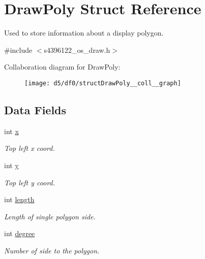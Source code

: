 \hypertarget{structDrawPoly}{}\section{Draw\+Poly Struct Reference}
\label{structDrawPoly}


Used to store information about a display polygon.  




{\ttfamily \#include $<$s4396122\+\_\+os\+\_\+draw.\+h$>$}



Collaboration diagram for Draw\+Poly\+:\nopagebreak
\begin{figure}[H]
\begin{center}
\leavevmode
\texttt{[image: d5/df0/structDrawPoly\_\_coll\_\_graph]}
\end{center}
\end{figure}
\subsection*{Data Fields}
\begin{DoxyCompactItemize}
\item 
int \hyperlink{structDrawPoly_abaa264798080d3c1064af0028a4705d6}{x}\hypertarget{structDrawPoly_abaa264798080d3c1064af0028a4705d6}{}\label{structDrawPoly_abaa264798080d3c1064af0028a4705d6}

\begin{DoxyCompactList}\small\item\em Top left x coord. \end{DoxyCompactList}\item 
int \hyperlink{structDrawPoly_a1693518092db72ae62079ba775f73275}{y}\hypertarget{structDrawPoly_a1693518092db72ae62079ba775f73275}{}\label{structDrawPoly_a1693518092db72ae62079ba775f73275}

\begin{DoxyCompactList}\small\item\em Top left y coord. \end{DoxyCompactList}\item 
int \hyperlink{structDrawPoly_ae1c2832fdce510858ef0effeb416fc04}{length}\hypertarget{structDrawPoly_ae1c2832fdce510858ef0effeb416fc04}{}\label{structDrawPoly_ae1c2832fdce510858ef0effeb416fc04}

\begin{DoxyCompactList}\small\item\em Length of single polygon side. \end{DoxyCompactList}\item 
int \hyperlink{structDrawPoly_aeebb1111db54f44bb95338c2bde212cd}{degree}\hypertarget{structDrawPoly_aeebb1111db54f44bb95338c2bde212cd}{}\label{structDrawPoly_aeebb1111db54f44bb95338c2bde212cd}

\begin{DoxyCompactList}\small\item\em Number of side to the polygon. \end{DoxyCompactList}\end{DoxyCompactItemize}


